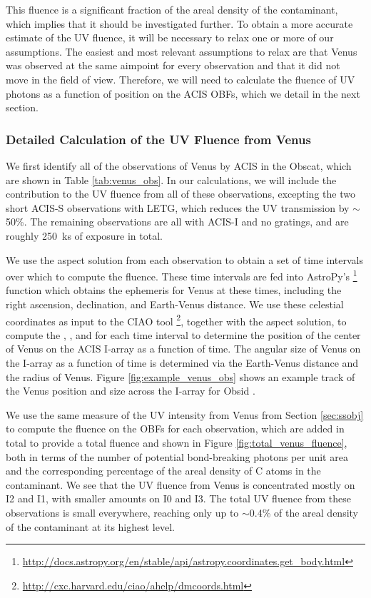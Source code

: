 \documentclass[11pt]{article}
\begin{document}
This fluence is a significant fraction of the areal density of the contaminant, which implies that it should be investigated further. To obtain a more accurate estimate of the UV fluence, it will be necessary to relax one or more of our assumptions. The easiest and most relevant assumptions to relax are that Venus was observed at the same aimpoint for every observation and that it did not move in the field of view. Therefore, we will need to calculate the fluence of UV photons as a function of position on the ACIS OBFs, which we detail in the next section.

\subsubsection{Detailed Calculation of the UV Fluence from Venus}\label{sec:venus}

We first identify all of the observations of Venus by ACIS in the Obscat, which are shown in Table \ref{tab:venus_obs}. In our calculations, we will include the contribution to the UV fluence from all of these
observations, excepting the two short ACIS-S observations with LETG, which reduces the UV transmission by $\sim$50\%. The remaining observations are all with ACIS-I and no gratings, and are roughly 250~ks of exposure in total.

We use the aspect solution from each observation to obtain a set of time intervals over which to compute the fluence. These time intervals are fed into AstroPy's \footnote{\url{http://docs.astropy.org/en/stable/api/astropy.coordinates.get_body.html}} function which obtains the ephemeris for Venus at these times, including the right ascension, declination, and Earth-Venus distance. We use these celestial coordinates as input to the CIAO tool \footnote{\url{http://cxc.harvard.edu/ciao/ahelp/dmcoords.html}}, together with the aspect solution, to compute the , , and  for each time interval to determine the position of the center of Venus on the ACIS I-array as a function of time. The angular size of Venus on the I-array as a function of time is determined via the Earth-Venus distance and the radius of Venus. Figure \ref{fig:example_venus_obs} shows an example track of the Venus position and size across the I-array for Obsid .

We use the same measure of the UV intensity from Venus from Section \ref{sec:ssobj} to compute the fluence on the OBFs for each observation, which are added in total to provide a total fluence and shown in Figure \ref{fig:total_venus_fluence}, both in terms of the number of potential bond-breaking photons per unit area and the corresponding percentage of the areal density of C atoms in the contaminant. We see that the UV fluence from Venus is concentrated mostly on I2 and I1, with smaller amounts on I0 and I3. The total UV fluence from these observations is small everywhere, reaching only up to $\sim$0.4\% of the areal density of the contaminant at its highest level. 
\end{document}

